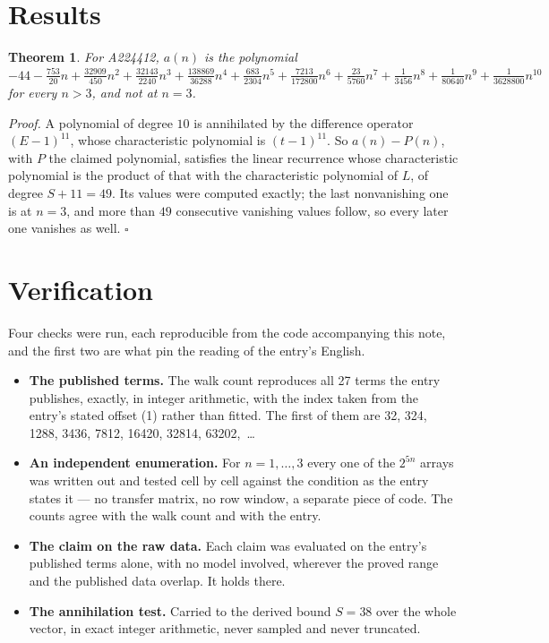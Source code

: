 \documentclass[11pt]{article}
\newtheorem{theorem}{Theorem}
\theoremstyle{definition}
\begin{document}
\section{Results}

\begin{theorem} For A224412, $a(n)$ is the polynomial $-44 - \frac{753}{20}n + \frac{32909}{450}n^{2} + \frac{32143}{2240}n^{3} + \frac{138869}{36288}n^{4} + \frac{683}{2304}n^{5} + \frac{7213}{172800}n^{6} + \frac{23}{5760}n^{7} + \frac{1}{3456}n^{8} + \frac{1}{80640}n^{9} + \frac{1}{3628800}n^{10}$ for every $n > 3$, and not at $n = 3$.\end{theorem}

{\itshape Proof.} A polynomial of degree $10$ is annihilated by the difference operator $(E-1)^{11}$, whose characteristic polynomial is $(t-1)^{11}$. So $a(n) - P(n)$, with $P$ the claimed polynomial, satisfies the linear recurrence whose characteristic polynomial is the product of that with the characteristic polynomial of $L$, of degree $S + 11 = 49$. Its values were computed exactly; the last nonvanishing one is at $n = 3$, and more than $49$ consecutive vanishing values follow, so every later one vanishes as well. $\square$

\section{Verification}

Four checks were run, each reproducible from the code accompanying this note, and the first two are what pin the reading of the entry's English.

\begin{itemize}

\item {\bfseries The published terms.} The walk count reproduces all 27 terms the entry publishes, exactly, in integer arithmetic, with the index taken from the entry's stated offset (1) rather than fitted. The first of them are 32, 324, 1288, 3436, 7812, 16420, 32814, 63202,~\dots

\item {\bfseries An independent enumeration.} For $n = 1,\dots,3$ every one of the $2^{5n}$ arrays was written out and tested cell by cell against the condition as the entry states it --- no transfer matrix, no row window, a separate piece of code. The counts agree with the walk count and with the entry.

\item {\bfseries The claim on the raw data.} Each claim was evaluated on the entry's published terms alone, with no model involved, wherever the proved range and the published data overlap. It holds there.

\item {\bfseries The annihilation test.} Carried to the derived bound $S = 38$ over the whole vector, in exact integer arithmetic, never sampled and never truncated.

\end{itemize}
\end{document}
